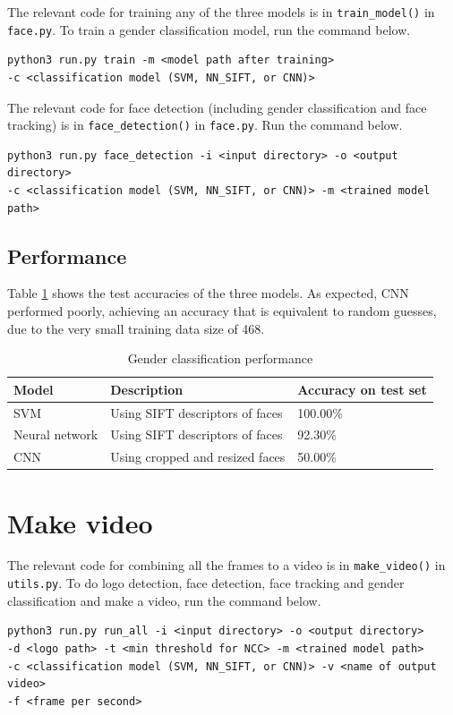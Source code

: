 \documentclass{article}
\begin{document}
The relevant code for training any of the three models is in \texttt{train\_model()} in \texttt{face.py}. To train a gender classification model, run the command below.
\begin{verbatim}
python3 run.py train -m <model path after training> 
-c <classification model (SVM, NN_SIFT, or CNN)>
\end{verbatim}

The relevant code for face detection (including gender classification and face tracking) is in \texttt{face\_detection()} in \texttt{face.py}. Run the command below.
\begin{verbatim}
python3 run.py face_detection -i <input directory> -o <output directory>
-c <classification model (SVM, NN_SIFT, or CNN)> -m <trained model path> 
\end{verbatim}

\subsection*{Performance}
Table \ref{tab:gender_classification} shows the test accuracies of the three models. As expected, CNN performed poorly, achieving an accuracy that is equivalent to random guesses, due to the very small training data size of 468.

\begin{table}[h]
 \caption{Gender classification performance}
  \centering
  \begin{tabular}{lll}
    \toprule
    Model		& Description														& Accuracy on test set \\
    \midrule
    SVM							& 	Using SIFT descriptors of faces						& 100.00\% \\
    Neural network		& Using SIFT descriptors of faces							& 92.30\% \\
    CNN							&	Using cropped and resized faces						& 50.00\% \\
    \bottomrule
  \end{tabular}
  \label{tab:gender_classification}
\end{table}

\section{Make video}
The relevant code for combining all the frames to a video is in \texttt{make\_video()} in \texttt{utils.py}. To do logo detection, face detection, face tracking and gender classification and make a video, run the command below.
\begin{verbatim}
python3 run.py run_all -i <input directory> -o <output directory>
-d <logo path> -t <min threshold for NCC> -m <trained model path>
-c <classification model (SVM, NN_SIFT, or CNN)> -v <name of output video>
-f <frame per second>
\end{verbatim}
\end{document}
